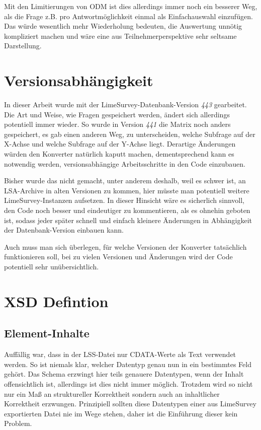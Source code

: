 Mit den Limitierungen von ODM ist dies allerdings immer noch ein besserer Weg, als die Frage z.B. pro Antwortmöglichkeit einmal als Einfachauswahl einzufügen.
Das würde wesentlich mehr Wiederholung bedeuten, die Auswertung unnötig kompliziert machen und wäre eine aus Teilnehmerperspektive sehr seltsame Darstellung.

\section{Versionsabhängigkeit}
\label{d:version}

In dieser Arbeit wurde mit der LimeSurvey-Datenbank-Version \textit{443} gearbeitet.
Die Art und Weise, wie Fragen gespeichert werden, ändert sich allerdings potentiell immer wieder.
So wurde in Version \textit{441} die Matrix noch anders gespeichert, es gab einen anderen Weg, zu unterscheiden, welche Subfrage auf der X-Achse und welche Subfrage auf der Y-Achse liegt.
Derartige Änderungen würden den Konverter natürlich kaputt machen, dementsprechend kann es notwendig werden, versionsabhängige Arbeitsschritte in den Code einzubauen.

Bisher wurde das nicht gemacht, unter anderem deshalb, weil es schwer ist, an LSA-Archive in alten Versionen zu kommen, hier müsste man potentiell weitere LimeSurvey-Instanzen aufsetzen.
In dieser Hinsicht wäre es sicherlich sinnvoll, den Code noch besser und eindeutiger zu kommentieren, als es ohnehin geboten ist, sodass jeder später schnell und einfach kleinere Änderungen in Abhängigkeit der Datenbank-Version einbauen kann.

Auch muss man sich überlegen, für welche Versionen der Konverter tatsächlich funktionieren soll, bei zu vielen Versionen und Änderungen wird der Code potentiell sehr unübersichtlich.

\section{XSD Defintion}

\subsection{Element-Inhalte}

Auffällig war, dass in der LSS-Datei nur CDATA-Werte als Text verwendet werden.
So ist niemals klar, welcher Datentyp genau nun in ein bestimmtes Feld gehört.
Das Schema erzwingt hier teils genauere Datentypen, wenn der Inhalt offensichtlich ist, allerdings ist dies nicht immer möglich.
Trotzdem wird so nicht nur ein Maß an struktureller Korrektheit sondern auch an inhaltlicher Korrektheit erzwungen.
Prinzipiell sollten diese Datentypen einer aus LimeSurvey exportierten Datei nie im Wege stehen, daher ist die Einführung dieser kein Problem.

